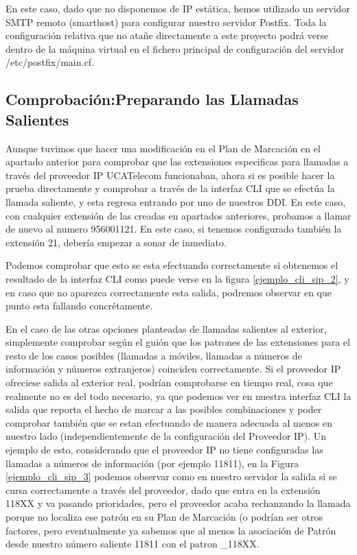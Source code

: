 En este caso, dado que no disponemos de IP estática, hemos utilizado un servidor SMTP remoto (smarthost) para configurar nuestro servidor Postfix. Toda la configuración relativa que no atañe directamente a este proyecto podrá verse dentro de la máquina virtual en el fichero principal de configuración del servidor /etc/postfix/main.cf. \cite{website:relaysmtp}

\subsection{Comprobación:Preparando las Llamadas Salientes}

Aunque tuvimos que hacer una modificación en el Plan de Marcación en el apartado anterior para comprobar que las extensiones especificas para llamadas a través del proveedor IP UCATelecom funcionaban, ahora si es posible hacer la prueba directamente y comprobar a través de la interfaz CLI que se efectúa la llamada saliente, y esta regresa entrando por uno de nuestros DDI. En este caso, con cualquier extensión de las creadas en apartados anteriores, probamos a llamar de nuevo al numero 956001121. En este caso, si tenemos configurado también la extensión 21, debería empezar a sonar de inmediato.

Podemos comprobar que esto se esta efectuando correctamente si obtenemos el resultado de la interfaz CLI como puede verse en la figura \ref{ejemplo_cli_sip_2}, y en caso que no aparezca correctamente esta salida, podremos observar en que punto esta fallando concrétamente.


En el caso de las otras opciones planteadas de llamadas salientes al exterior, simplemente comprobar según el guión que los patrones de las extensiones para el resto de los casos posibles (llamadas a móviles, llamadas a números de información y números extranjeros) coinciden correctamente. Si el proveedor IP ofreciese salida al exterior real, podrían comprobarse en tiempo real, cosa que realmente no es del todo necesario, ya que podemos ver en nuestra interfaz CLI la salida que reporta el hecho de marcar a las posibles combinaciones y poder comprobar también que se estan efectuando de manera adecuada al menos en nuestro lado (independientemente de la configuración del Proveedor IP). Un ejemplo de esto, considerando que el proveedor IP no tiene configuradas las llamadas a números de información (por ejemplo 11811), en la Figura \ref{ejemplo_cli_sip_3} podemos observar como en nuestro servidor la salida si se cursa correctamente a través del proveedor, dado que entra en la extensión 118XX y va pasando prioridades, pero el proveedor acaba rechanzando la llamada porque no localiza ese patrón en su Plan de Marcación (o podrían ser otros factores, pero eventualmente ya sabemos que al menos la asociación de Patrón desde nuestro número saliente 11811 con el patron \_118XX.

